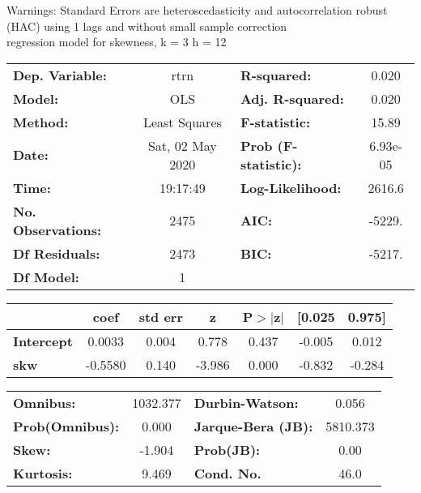 Warnings: \newline
 [1] Standard Errors are heteroscedasticity and autocorrelation robust (HAC) using 1 lags and without small sample correction\\ 

regression model for skewness, k = 3 h = 12\begin{center}
\begin{tabular}{lclc}
\toprule
\textbf{Dep. Variable:}    &       rtrn       & \textbf{  R-squared:         } &     0.020   \\
\textbf{Model:}            &       OLS        & \textbf{  Adj. R-squared:    } &     0.020   \\
\textbf{Method:}           &  Least Squares   & \textbf{  F-statistic:       } &     15.89   \\
\textbf{Date:}             & Sat, 02 May 2020 & \textbf{  Prob (F-statistic):} &  6.93e-05   \\
\textbf{Time:}             &     19:17:49     & \textbf{  Log-Likelihood:    } &    2616.6   \\
\textbf{No. Observations:} &        2475      & \textbf{  AIC:               } &    -5229.   \\
\textbf{Df Residuals:}     &        2473      & \textbf{  BIC:               } &    -5217.   \\
\textbf{Df Model:}         &           1      & \textbf{                     } &             \\
\bottomrule
\end{tabular}
\begin{tabular}{lcccccc}
                   & \textbf{coef} & \textbf{std err} & \textbf{z} & \textbf{P$> |$z$|$} & \textbf{[0.025} & \textbf{0.975]}  \\
\midrule
\textbf{Intercept} &       0.0033  &        0.004     &     0.778  &         0.437        &       -0.005    &        0.012     \\
\textbf{skw}       &      -0.5580  &        0.140     &    -3.986  &         0.000        &       -0.832    &       -0.284     \\
\bottomrule
\end{tabular}
\begin{tabular}{lclc}
\textbf{Omnibus:}       & 1032.377 & \textbf{  Durbin-Watson:     } &    0.056  \\
\textbf{Prob(Omnibus):} &   0.000  & \textbf{  Jarque-Bera (JB):  } & 5810.373  \\
\textbf{Skew:}          &  -1.904  & \textbf{  Prob(JB):          } &     0.00  \\
\textbf{Kurtosis:}      &   9.469  & \textbf{  Cond. No.          } &     46.0  \\
\bottomrule
\end{tabular}
\end{center}

